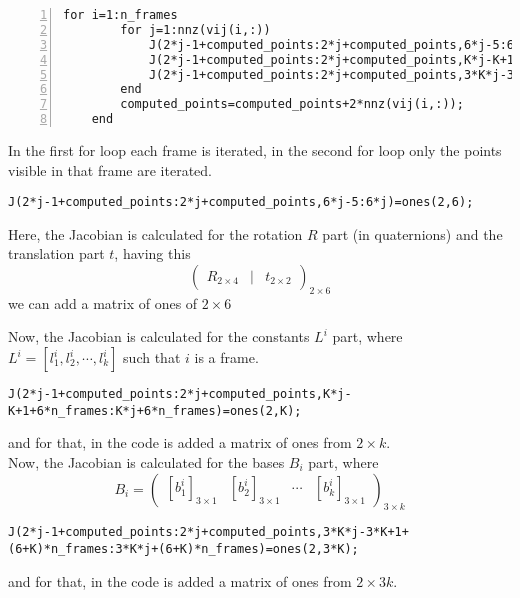 \begin{lstlisting}[style=Matlab-editor, numbers=left]
for i=1:n_frames
        for j=1:nnz(vij(i,:))        
            J(2*j-1+computed_points:2*j+computed_points,6*j-5:6*j)=ones(2,6);
            J(2*j-1+computed_points:2*j+computed_points,K*j-K+1+6*n_frames:K*j+6*n_frames)=ones(2,K);
            J(2*j-1+computed_points:2*j+computed_points,3*K*j-3*K+1+(6+K)*n_frames:3*K*j+(6+K)*n_frames)=ones(2,3*K);
        end
        computed_points=computed_points+2*nnz(vij(i,:));
    end
\end{lstlisting}
\noindent In the first for loop each frame is iterated, in the second for loop only the points visible in that frame are iterated.\\
\begin{lstlisting}[style=Matlab-editor]
J(2*j-1+computed_points:2*j+computed_points,6*j-5:6*j)=ones(2,6);
\end{lstlisting}
\noindent Here, the Jacobian is calculated for the rotation $R$ part (in quaternions) and the translation part $t$, having this
\begin{equation}
\begin{pmatrix}
R_{2\times 4} & | & t_{2\times 2}
\end{pmatrix}_{2\times 6}
\end{equation}
we can add a matrix of ones of $2\times 6$

\noindent Now, the Jacobian is calculated for the constants $L^{i}$ part, where $L^{i}=[l_{1}^{i},l_{2}^{i}, \cdots, l_{k}^{i}]$ such that $i$ is a frame.
\begin{lstlisting}[style=Matlab-editor]
J(2*j-1+computed_points:2*j+computed_points,K*j-K+1+6*n_frames:K*j+6*n_frames)=ones(2,K);
\end{lstlisting}
and for that, in the code is added a matrix of ones from $2\times k$.\\

\noindent Now, the Jacobian is calculated for the bases $B_{i}$ part, where
\begin{equation}
B_{i}=\begin{pmatrix}
[b_{1}^{i}]_{3\times 1} & [b_{2}^{i}]_{3\times 1} & \cdots & [b_{k}^{i}]_{3\times 1}
\end{pmatrix}_{3\times k}
\end{equation}
\begin{lstlisting}[style=Matlab-editor]
J(2*j-1+computed_points:2*j+computed_points,3*K*j-3*K+1+(6+K)*n_frames:3*K*j+(6+K)*n_frames)=ones(2,3*K);
\end{lstlisting}
\noindent and for that, in the code is added a matrix of ones from $2\times 3k$.\\

